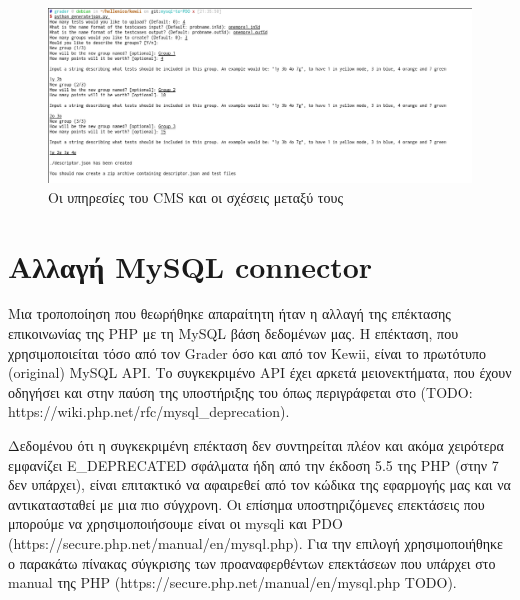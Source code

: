\documentclass[diploma]{softlab-thesis}
\begin{document}
\begin{figure}
  \centering
  \includegraphics[scale=0.4,trim=4 4 4 4,clip]{Figures/interactive.png}
  \caption[Παράδειγμα χρήσης interactive generator script]{Οι υπηρεσίες του CMS και οι σχέσεις μεταξύ τους}
\end{figure}

\section{Αλλαγή MySQL connector}

Μια τροποποίηση που θεωρήθηκε απαραίτητη ήταν η αλλαγή της επέκτασης
επικοινωνίας της PHP με τη MySQL βάση δεδομένων μας. Η επέκταση, που
χρησιμοποιείται τόσο από τον Grader όσο και από τον Kewii, είναι το πρωτότυπο
(original) MySQL API. Το συγκεκριμένο API έχει αρκετά μειονεκτήματα, που έχουν
οδηγήσει και στην παύση της υποστήριξης του όπως περιγράφεται στο (TODO:
https://wiki.php.net/rfc/mysql\_deprecation).

\bigskip

Δεδομένου ότι η συγκεκριμένη επέκταση δεν συντηρείται πλέον και ακόμα χειρότερα
εμφανίζει E\_DEPRECATED σφάλματα ήδη από την έκδοση 5.5 της PHP (στην 7 δεν
υπάρχει), είναι επιτακτικό να αφαιρεθεί από τον κώδικα της εφαρμογής μας και να
αντικατασταθεί με μια πιο σύγχρονη. Οι επίσημα υποστηριζόμενες επεκτάσεις που
μπορούμε να χρησιμοποιήσουμε είναι οι mysqli και PDO
(https://secure.php.net/manual/en/mysql.php). Για την επιλογή χρησιμοποιήθηκε ο
παρακάτω πίνακας σύγκρισης των προαναφερθέντων επεκτάσεων που υπάρχει στο
manual της PHP (https://secure.php.net/manual/en/mysql.php TODO).
\end{document}
